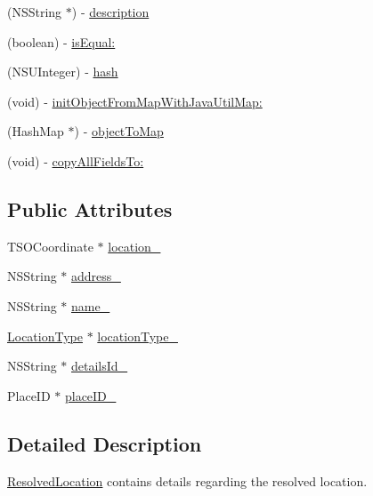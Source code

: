 \begin{DoxyCompactItemize}
(N\+S\+String $\ast$) -\/ \hyperlink{interface_resolved_location_a4586d25c1aea1b4231656480c7b50a49}{description}
\item 
(boolean) -\/ \hyperlink{interface_resolved_location_a517c12200297246638505d3a1e03331a}{is\+Equal\+:}
\item 
(N\+S\+U\+Integer) -\/ \hyperlink{interface_resolved_location_a731d73d05bbd61d1840aa3f51662a9f9}{hash}
\item 
(void) -\/ \hyperlink{interface_resolved_location_aeacbde0720e7f2723475ab9bc73177b6}{init\+Object\+From\+Map\+With\+Java\+Util\+Map\+:}
\item 
(Hash\+Map $\ast$) -\/ \hyperlink{interface_resolved_location_af4f49d556c0f98ac3ed3a0827c8ff1fe}{object\+To\+Map}
\item 
(void) -\/ \hyperlink{interface_resolved_location_aeaf8c596d5ec6866a3b63583b7703264}{copy\+All\+Fields\+To\+:}
\end{DoxyCompactItemize}
\subsection*{Public Attributes}
\begin{DoxyCompactItemize}
\item 
T\+S\+O\+Coordinate $\ast$ \hyperlink{interface_resolved_location_ad7dba94c2ab6097a755a5ea12ce0608a}{location\+\_\+}
\item 
N\+S\+String $\ast$ \hyperlink{interface_resolved_location_a77d427561f6ec1a1ee95e57ca9577467}{address\+\_\+}
\item 
N\+S\+String $\ast$ \hyperlink{interface_resolved_location_acad6f92251f1776b162e841e696d305e}{name\+\_\+}
\item 
\hyperlink{interface_location_type}{Location\+Type} $\ast$ \hyperlink{interface_resolved_location_a3245ac55d10d98e088602bc370c3337d}{location\+Type\+\_\+}
\item 
N\+S\+String $\ast$ \hyperlink{interface_resolved_location_a96efd566353a71f21a783dc039b83673}{details\+Id\+\_\+}
\item 
Place\+I\+D $\ast$ \hyperlink{interface_resolved_location_a102fcd28defcc06837f9ab6d2385b44f}{place\+I\+D\+\_\+}
\end{DoxyCompactItemize}


\subsection{Detailed Description}
\hyperlink{interface_resolved_location}{Resolved\+Location} contains details regarding the resolved location. 

